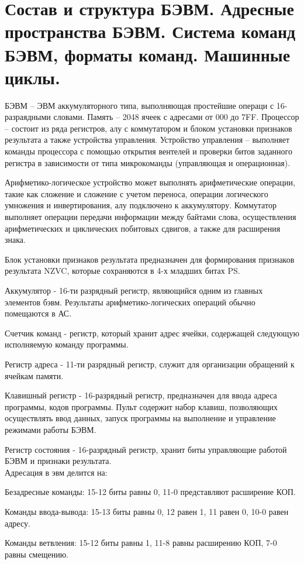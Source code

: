 \documentclass{article}
\begin{document}
\section{Состав и структура БЭВМ. Адресные пространства БЭВМ. Система команд БЭВМ, форматы команд. Машинные циклы.}
БЭВМ – ЭВМ аккумуляторного типа, выполняющая простейшие операци с 16-разраядными словами.
Память – 2048 ячеек с адресами от 000 до 7FF. Процессор – состоит из ряда регистров, алу с коммутатором и блоком установки признаков результата а также устройства управления.
Устройство управления – выполняет команды процессора с помощью открытия вентелей и проверки битов заданного регистра в зависимости от типа микрокоманды (управляющая и операционная).


Арифметико-логическое устройство может выполнять арифметические операции, такие как сложение и сложение с учетом переноса, 
операции логического умножения и инвертирования, алу подключено к аккумулятору. Коммутатор выполняет операции передачи информации между байтами слова,
осуществления арифметических и циклических побитовых сдвигов, а также для расширения знака.


Блок установки признаков результата предназначен для формирования признаков результата NZVC, которые сохраняются в 4-х младших битах PS.


Аккумулятор - 16-ти разрядный регистр, являющийся одним из главных элементов бэвм. 
Результаты арифметико-логических операций обычно помещаются в АС.


Счетчик команд - регистр, который хранит адрес ячейки, содержащей следующую исполняемую команду программы.


Регистр адреса - 11-ти разрядный регистр, служит для организации обращений к ячейкам памяти.

Клавишный регистр - 16-разрядный регистр, предназначен для ввода адреса программы, 
кодов программы. Пульт содержит набор клавиш, позволяющих осуществлять ввод данных, 
запуск программы на выполнение и управление режимами работы БЭВМ.


Регистр состояния - 16-разрядный регистр, хранит биты управляющие работой БЭВМ и признаки 
результата.\\
Адресация в эвм делится на:


Безадресные команды: 15-12 биты равны 0, 11-0 представляют расширение КОП.


Команды ввода-вывода: 15-13 биты равны 0, 12 равен 1, 11 равен 0, 10-0 равен адресу.


Команды ветвления: 15-12 биты равны 1, 11-8 равны расширению КОП, 7-0 равны смещению.
\end{document}
